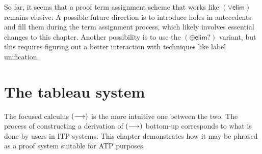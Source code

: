 \documentclass[twoside]{report}
\begin{document}
So far, it seems that a proof term assignment scheme that works like $(\lor\mathsf{elim})$ remains elusive. A possible future direction is to introduce holes in antecedents and fill them during the term assignment process, which likely involves essential changes to this chapter. Another possibility is to use the $(\oplus\mathsf{elim}?)$ variant, but this requires figuring out a better interaction with techniques like label unification.

\chapter{The tableau system}
\label{sec:the_tableau_system}

The focused calculus $(\longrightarrow)$ is the more intuitive one between the two. The process of constructing a derivation of $(\longrightarrow)$ bottom-up corresponds to what is done by users in ITP systems. This chapter demonstrates how it may be phrased as a proof system suitable for ATP purposes.




\end{document}
